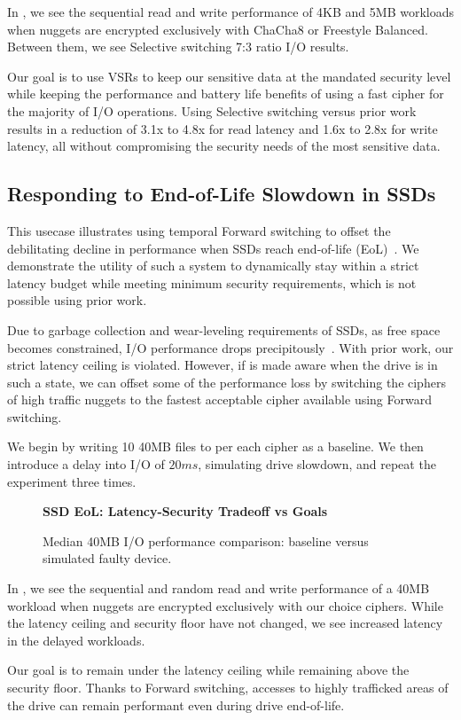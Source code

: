 In , we see the sequential read and write performance of
4KB and 5MB workloads when nuggets are encrypted exclusively with ChaCha8 or
Freestyle Balanced. Between them, we see Selective switching 7:3 ratio I/O
results.

Our goal is to use VSRs to keep our sensitive data at the mandated security
level while keeping the performance and battery life benefits of using a fast
cipher for the majority of I/O operations. Using \sys{} Selective switching
versus prior work results in a reduction of 3.1x to 4.8x for read latency and
1.6x to 2.8x for write latency, all without compromising the security needs of
the most sensitive data.

\subsection{Responding to End-of-Life Slowdown in SSDs} \label{subsec:uc3}

This usecase illustrates using temporal Forward switching to offset the
debilitating decline in performance when SSDs reach end-of-life
(EoL)~\cite{SSDEOL1}. We demonstrate the utility of such a system to dynamically
stay within a strict latency budget while meeting minimum security requirements,
which is not possible using prior work.

Due to garbage collection and wear-leveling requirements of SSDs, as free space
becomes constrained, I/O performance drops precipitously~\cite{SSDEOL1}. With
prior work, our strict latency ceiling is violated. However, if \sys{} is
made aware when the drive is in such a state, we can offset some of the
performance loss by switching the ciphers of high traffic nuggets to the fastest
acceptable cipher available using Forward switching.

We begin by writing 10 40MB files to \sys{} per each cipher as a baseline.
We then introduce a delay into \sys{} I/O of $20ms$, simulating drive
slowdown, and repeat the experiment three times.

\begin{figure}[ht] \textbf{SSD EoL: Latency-Security Tradeoff vs
   Goals}\par\medskip {} \caption{Median
   40MB I/O performance comparison: baseline versus simulated faulty device.}
  \label{fig:usecase-eol-tradeoff}
\end{figure}

In , we see the sequential and random read and
write performance of a 40MB workload when nuggets are encrypted exclusively with
our choice ciphers. While the latency ceiling and security floor have not
changed, we see increased latency in the delayed workloads.

Our goal is to remain under the latency ceiling while remaining above
the security floor. Thanks to Forward switching, accesses to highly
trafficked areas of the drive can remain performant even during drive
end-of-life.  
